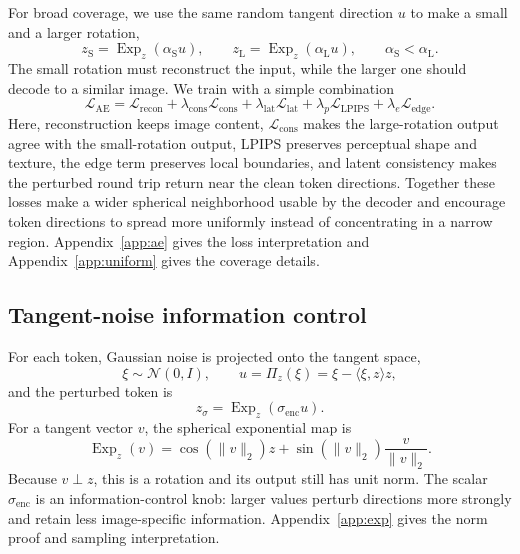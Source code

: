\documentclass{article}
\begin{document}
For broad coverage, we use the same random tangent direction $u$ to make a small and a larger rotation,
\begin{equation}
 z_{\mathrm{S}}=\operatorname{Exp}_{z}(\alpha_{\mathrm{S}}u),\qquad
 z_{\mathrm{L}}=\operatorname{Exp}_{z}(\alpha_{\mathrm{L}}u),\qquad
 \alpha_{\mathrm{S}}<\alpha_{\mathrm{L}}.
\end{equation}
The small rotation must reconstruct the input, while the larger one should decode to a similar image. We train with a simple combination
\begin{equation}
 \mathcal L_{\mathrm{AE}}
 =\mathcal L_{\mathrm{recon}}+\lambda_{\mathrm{cons}}\mathcal L_{\mathrm{cons}}
 +\lambda_{\mathrm{lat}}\mathcal L_{\mathrm{lat}}
 +\lambda_p\mathcal L_{\mathrm{LPIPS}}+\lambda_e\mathcal L_{\mathrm{edge}}.
\label{eq:ae}
\end{equation}
Here, reconstruction keeps image content, $\mathcal L_{\mathrm{cons}}$ makes the large-rotation output agree with the small-rotation output, LPIPS preserves perceptual shape and texture, the edge term preserves local boundaries, and latent consistency makes the perturbed round trip return near the clean token directions. Together these losses make a wider spherical neighborhood usable by the decoder and encourage token directions to spread more uniformly instead of concentrating in a narrow region. Appendix~\ref{app:ae} gives the loss interpretation and Appendix~\ref{app:uniform} gives the coverage details.

\subsection{Tangent-noise information control}
For each token, Gaussian noise is projected onto the tangent space,
\begin{equation}
 \xi\sim\mathcal N(0,I),\qquad
 u=\Pi_z(\xi)=\xi-\langle\xi,z\rangle z,
\end{equation}
and the perturbed token is
\begin{equation}
 z_\sigma=\operatorname{Exp}_z(\sigma_{\mathrm{enc}}u).
\label{eq:noise}
\end{equation}
For a tangent vector $v$, the spherical exponential map is
\begin{equation}
 \operatorname{Exp}_z(v)=\cos(\|v\|_2)z+\sin(\|v\|_2)\frac{v}{\|v\|_2}.
\label{eq:exp}
\end{equation}
Because $v\perp z$, this is a rotation and its output still has unit norm. The scalar $\sigma_{\mathrm{enc}}$ is an information-control knob: larger values perturb directions more strongly and retain less image-specific information. Appendix~\ref{app:exp} gives the norm proof and sampling interpretation.
\end{document}
